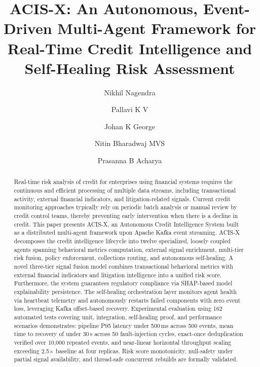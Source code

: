\documentclass[runningheads]{llncs}
\begin{document}
\title{ACIS-X: An Autonomous, Event-Driven Multi-Agent Framework for Real-Time Credit Intelligence and Self-Healing Risk Assessment}


\author{Nikhil Nagendra \and
Pallavi K V \and
Johan K George \and
Nitin Bharadwaj MVS \and
Prasanna B Acharya}



\maketitle

\begin{abstract}
Real-time risk analysis of credit for enterprises using financial systems requires the continuous and efficient processing of multiple data streams, including transactional activity, external financial indicators, and litigation-related signals. Current credit monitoring approaches typically rely on periodic batch analysis or manual review by credit control teams, thereby preventing early intervention when there is a decline in credit. This paper presents ACIS-X, an Autonomous Credit Intelligence System built as a distributed multi-agent framework upon Apache Kafka event streaming. ACIS-X decomposes the credit intelligence lifecycle into twelve specialized, loosely coupled agents spanning behavioral metrics computation, external signal enrichment, multi-tier risk fusion, policy enforcement, collections routing, and autonomous self-healing. A novel three-tier signal fusion model combines transactional behavioral metrics with external financial indicators and litigation intelligence into a unified risk score. Furthermore, the system guarantees regulatory compliance via SHAP-based model explainability persistence. The self-healing orchestration layer monitors agent health via heartbeat telemetry and autonomously restarts failed components with zero event loss, leveraging Kafka offset-based recovery. Experimental evaluation using 162 automated tests covering unit, integration, self-healing proof, and performance scenarios demonstrates: pipeline P95 latency under 500\,ms across 500 events, mean time to recovery of under 30\,s across 50 fault-injection cycles, exact-once deduplication verified over 10,000 repeated events, and near-linear horizontal throughput scaling exceeding 2.5$\times$ baseline at four replicas. Risk score monotonicity, null-safety under partial signal availability, and thread-safe concurrent rebuilds are formally validated.
\end{abstract}
\end{document}
